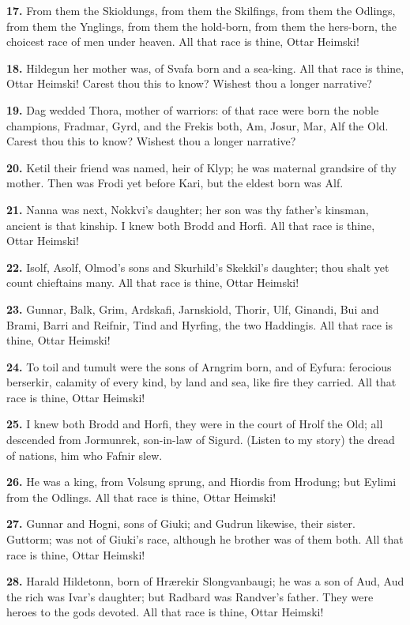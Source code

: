 \textbf{17.} From them the Skioldungs, from them the Skilfings, from them the
Odlings, from them the Ynglings, from them the hold-born, from them
the hers-born, the choicest race of men under heaven. All that race is
thine, Ottar Heimski!

\textbf{18.} Hildegun her mother was, of Svafa born and a sea-king. All that
race is thine, Ottar Heimski! Carest thou this to know? Wishest thou a
longer narrative?

\textbf{19.} Dag wedded Thora, mother of warriors: of that race were born the
noble champions, Fradmar, Gyrd, and the Frekis both, Am, Josur, Mar,
Alf the Old. Carest thou this to know? Wishest thou a longer
narrative?

\textbf{20.} Ketil their friend was named, heir of Klyp; he was maternal
grandsire of thy mother. Then was Frodi yet before Kari, but the
eldest born was Alf.

\textbf{21.} Nanna was next, Nokkvi's daughter; her son was thy father's
kinsman, ancient is that kinship. I knew both Brodd and Horfi. All
that race is thine, Ottar Heimski!

\textbf{22.} Isolf, Asolf, Olmod's sons and Skurhild's Skekkil's daughter;
thou shalt yet count chieftains many. All that race is thine, Ottar
Heimski!

\textbf{23.} Gunnar, Balk, Grim, Ardskafi, Jarnskiold, Thorir, Ulf, Ginandi,
Bui and Brami, Barri and Reifnir, Tind and Hyrfing, the two Haddingis.
All that race is thine, Ottar Heimski!

\textbf{24.} To toil and tumult were the sons of Arngrim born, and of Eyfura:
ferocious berserkir, calamity of every kind, by land and sea, like
fire they carried. All that race is thine, Ottar Heimski!

\textbf{25.} I knew both Brodd and Horfi, they were in the court of Hrolf the
Old; all descended from Jormunrek, son-in-law of Sigurd. (Listen to my
story) the dread of nations, him who Fafnir slew.

\textbf{26.} He was a king, from Volsung sprung, and Hiordis from Hrodung;
but Eylimi from the Odlings. All that race is thine, Ottar Heimski!

\textbf{27.} Gunnar and Hogni, sons of Giuki; and Gudrun likewise, their
sister. Guttorm; was not of Giuki's race, although he brother was of
them both. All that race is thine, Ottar Heimski!

\textbf{28.} Harald Hildetonn, born of Hrærekir Slongvanbaugi; he was a son
of Aud, Aud the rich was Ivar's daughter; but Radbard was Randver's
father. They were heroes to the gods devoted. All that race is thine,
Ottar Heimski!

